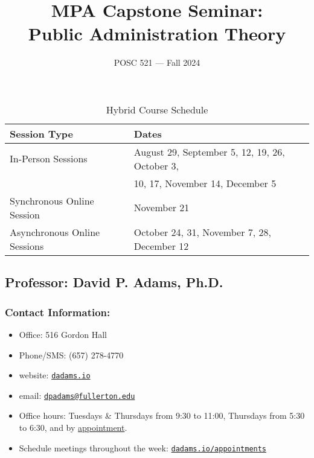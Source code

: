 \documentclass[12pt, letterpaper]{article}
\begin{document}
\title{MPA Capstone Seminar: \\ Public Administration Theory}
\author{POSC 521 — Fall 2024}
\date{}
    \maketitle

    \begin{table}[h!]
        \centering
        \begin{tabular}{|l|l|}
        \hline
        \textbf{Session Type}            & \textbf{Dates}                                 \\ \hline
        In-Person Sessions               & August 29, September 5, 12, 19, 26, October 3, \\
                                         & 10, 17, November 14, December 5                \\ \hline
        Synchronous Online Session       & November 21                                    \\ \hline
        Asynchronous Online Sessions     & October 24, 31, November 7, 28, December 12    \\ \hline
        \end{tabular}
        \caption{Hybrid Course Schedule}
        \label{table:hybrid_course_schedule}
        \end{table}
        
    \subsection*{Professor: David P. Adams, Ph.D.}

    \subsubsection*{Contact Information:}
    
    \begin{itemize}
        \item Office: 516 Gordon Hall
        \item Phone/SMS: (657) 278-4770
        \item website: \href{https://dadams.io}{\texttt{dadams.io}}
        \item email: \href{dpadams@fullerton.edu}{\texttt{dpadams@fullerton.edu}}
        \item Office hours: Tuesdays \& Thursdays from 9:30 to 11:00, Thursdays from 5:30 to 6:30, and by \href{https://dadams.io/appointments}{appointment}.
        \item Schedule meetings throughout the week: \href{https://dadams.io/appointments}{\texttt{dadams.io/appointments}}
    \end{itemize}
    
\end{document}
